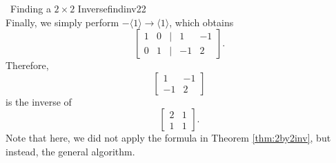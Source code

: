 \begin{example}{\Difficulty\,\Difficulty\,\,Finding a \(2\times 2\) Inverse}{findinv22}
\begin{equation*}
            \end{equation*}
            Finally, we simply perform \(-\langle1\rangle\to\langle1\rangle\), which obtains
            \begin{equation*}
                \begin{bmatrix}
                    1 & 0 & | & 1 & -1 \\
                    0 & 1 & | & -1 & 2
                \end{bmatrix}.
            \end{equation*}
            Therefore, 
            \begin{equation*}
                \begin{bmatrix}
                    1 & -1 \\
                    -1 & 2
                \end{bmatrix}
            \end{equation*}
            is the inverse of 
            \begin{equation*}
                \begin{bmatrix}
                    2 & 1 \\
                    1 & 1
                \end{bmatrix}.
            \end{equation*}
            Note that here, we did not apply the formula in Theorem \ref{thm:2by2inv}, but instead, the general algorithm.

        \end{example}
        \pagebreak
